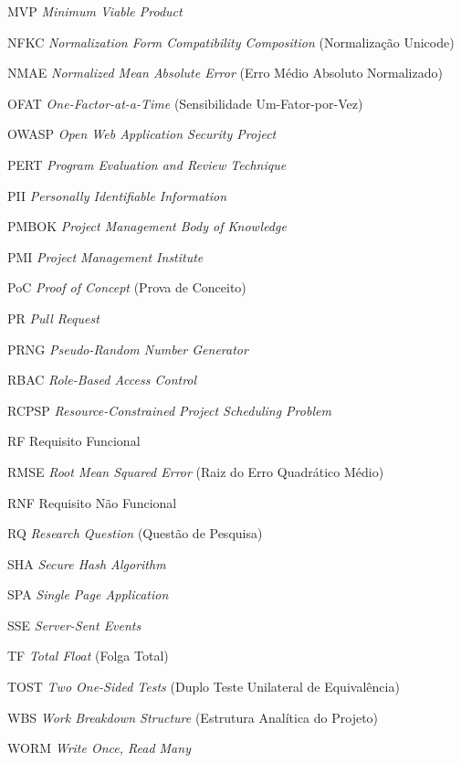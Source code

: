 \documentclass[12pt,openany,oneside,a4paper,english,brazilian,sumario=tradicional]{abntex2}
\begin{document}
\begin{siglas}
  \item[MVP] \textit{Minimum Viable Product}
  \item[NFKC] \textit{Normalization Form Compatibility Composition} (Normalização Unicode)
  \item[NMAE] \textit{Normalized Mean Absolute Error} (Erro Médio Absoluto Normalizado)
  \item[OFAT] \textit{One-Factor-at-a-Time} (Sensibilidade Um-Fator-por-Vez)
  \item[OWASP] \textit{Open Web Application Security Project}
  \item[PERT] \textit{Program Evaluation and Review Technique}
  \item[PII] \textit{Personally Identifiable Information}
  \item[PMBOK] \textit{Project Management Body of Knowledge}
  \item[PMI] \textit{Project Management Institute}
  \item[PoC] \textit{Proof of Concept} (Prova de Conceito)
  \item[PR] \textit{Pull Request}
  \item[PRNG] \textit{Pseudo-Random Number Generator}
  \item[RBAC] \textit{Role-Based Access Control}
  \item[RCPSP] \textit{Resource-Constrained Project Scheduling Problem}
  \item[RF] Requisito Funcional
  \item[RMSE] \textit{Root Mean Squared Error} (Raiz do Erro Quadrático Médio)
  \item[RNF] Requisito Não Funcional
  \item[RQ] \textit{Research Question} (Questão de Pesquisa)
  \item[SHA] \textit{Secure Hash Algorithm}
  \item[SPA] \textit{Single Page Application}
  \item[SSE] \textit{Server-Sent Events}
  \item[TF] \textit{Total Float} (Folga Total)
  \item[TOST] \textit{Two One-Sided Tests} (Duplo Teste Unilateral de Equivalência)
  \item[WBS] \textit{Work Breakdown Structure} (Estrutura Analítica do Projeto)
  \item[WORM] \textit{Write Once, Read Many}
\end{siglas}

\tableofcontents*
\cleardoublepage
\end{document}
